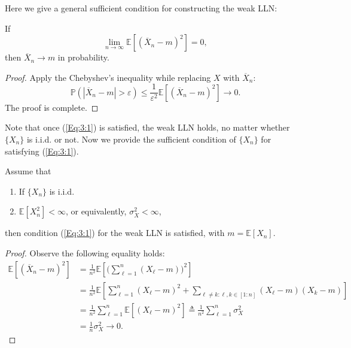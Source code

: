 Here we give a general sufficient condition for constructing the weak LLN:
\begin{proposition}
If 
\begin{equation}\label{Eq:3:1}
\lim_{n\to\infty}\mathbb{E}[(\overline{X}_n - m)^2]=0,
\end{equation}
then $\overline{X}_n\to m$ in probability.
\end{proposition}
\begin{proof}
Apply the Chebyshev's inequality while replacing $X$ with $\overline{X}_n$:
\[
\mathbb{P}\left(
|\overline{X}_n-m|>\varepsilon
\right)
\le
\frac{1}{\varepsilon^2}\mathbb{E}[(\overline{X}_n - m)^2]\to0.
\]
The proof is complete.
\end{proof}

Note that once (\ref{Eq:3:1}) is satisfied, the weak LLN holds, no matter whether $\{X_n\}$ is i.i.d. or not.
Now we provide the sufficient condition of $\{X_n\}$ for satisfying (\ref{Eq:3:1}).

\begin{theorem}
Assume that 
\begin{enumerate}
\item
If $\{X_n\}$ is i.i.d.
\item
$\mathbb{E}[X_n^2]<\infty$, or equivalently, $\sigma_X^2<\infty$,
\end{enumerate}
then condition (\ref{Eq:3:1}) for the weak LLN is satisfied, with $m=\mathbb{E}[X_n]$.
\end{theorem}
\begin{proof}
Observe the following equality holds:
\begin{align*}
\mathbb{E}[(\overline{X}_n-m)^2]&=\frac{1}{n^2}\mathbb{E}\left[
\bigg(\sum_{\ell=1}^n(X_{\ell}-m)\bigg)^2
\right]\\
&=
\frac{1}{n^2}\mathbb{E}\left[
\sum_{\ell=1}^n(X_{\ell}-m)^2
+
\sum_{\ell\ne k: \ell,k\in[1:n]}(X_{\ell}-m)(X_k-m)
\right]\\
&=\frac{1}{n^2}\sum_{\ell=1}^n\mathbb{E}\left[
(X_{\ell}-m)^2\right]\triangleq \frac{1}{n^2}\sum_{\ell=1}^n\sigma_X^2\\
&=\frac{1}{n}\sigma_X^2\to0.
\end{align*}
\end{proof}

